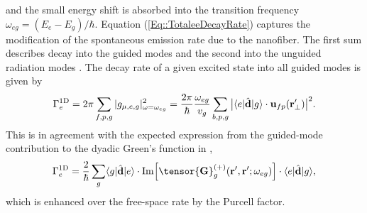 \documentclass[preprint, aps,pra,onecolumn]{revtex4-1} %
\newcommand{\oneD}{{\rm 1D}}
\begin{document}
and the small energy shift is absorbed into the transition frequency $\omega_{eg} = (E_e - E_g)/\hbar$.  
Equation (\ref{Eq::TotaleeDecayRate}) captures the modification of the spontaneous emission rate due to the nanofiber.  
The first sum describes decay into the guided modes and the second into the unguided radiation modes \cite{ nha_cavity_1997,klimov_spontaneous_2004,le_kien_spontaneous_2005,maslov_distribution_2006, scheel_directional_2015}. The decay rate of a given excited state into all guided modes is given by
	\begin{equation}
		\Gamma_e^{\oneD}= 2\pi \sum_{f,p,g} |g_{\mu,e,g} |^2_{\omega = \omega_{eg}} =  \frac{ 2\pi }{\hbar} \frac{ \omega_{eg} }{v_g} \sum_{b,p,g} \big|\bra{e}\hat{\mathbf{d}}\ket{g} \cdot \mathbf{u}_{fp}(\br'_\perp)\big|^2  .
	\end{equation}
This is in agreement with the expected expression from the guided-mode contribution to the dyadic Green's function in ,
	\begin{equation} \label{Eq::Gamma1DGreens}
		\Gamma_e^{\oneD} =  \frac{2}{\hbar} \sum_{g}  \bra{g}\hat{\mathbf{d}}\ket{e}\cdot 
{\rm Im} \Big[\tensor{\mathbf{G}}^{(+)}_g(\br', \br'; \omega_{eg} ) \Big] \cdot \bra{e}\hat{\mathbf{d}}\ket{g},
	\end{equation}
which is enhanced over the free-space rate by the Purcell factor. 
\end{document}
